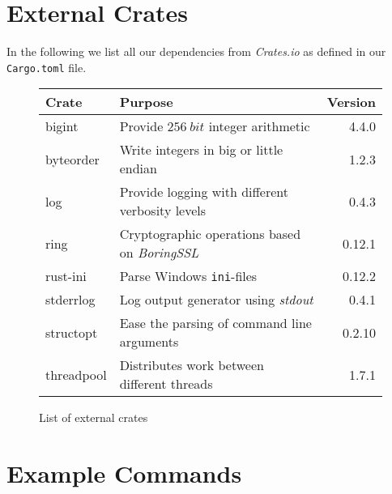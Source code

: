 \documentclass[a4paper, 11pt]{article}
\begin{document}
    \pagebreak
    
    \section{External Crates}
    \label{appendix:crates}
    
    In the following we list all our dependencies from \textit{Crates.io} as defined in our \texttt{Cargo.toml} file.
    
    \begin{figure}[H]
        \begin{longtable}{l l r}
            \toprule
            \textbf{Crate} & \textbf{Purpose} & \textbf{Version} \\
            \midrule
            bigint    & 	Provide $\SI{256}{bit}$ integer arithmetic                                         & 4.4.0  \\
            byteorder &     Write integers in big or little endian                                             & 1.2.3  \\
            log       &		Provide logging with different verbosity levels                                    & 0.4.3  \\
            ring      & 	Cryptographic operations based on \textit{BoringSSL}\protect\footnotemark          & 0.12.1 \\
            rust-ini  & 	Parse Windows \texttt{ini}-files                                                   & 0.12.2 \\
            stderrlog & 	Log output generator using \textit{stdout}                                         & 0.4.1  \\
            structopt &     Ease the parsing of command line arguments                                         & 0.2.10 \\
            threadpool&     Distributes work between different threads                                         & 1.7.1  \\
            \bottomrule
        \end{longtable}
        \caption{List of external crates}
        \label{table:crates}
    \end{figure}
    
    
    \pagebreak
    
    \section{Example Commands}
    \label{appendix:commands}
    
\end{document}
